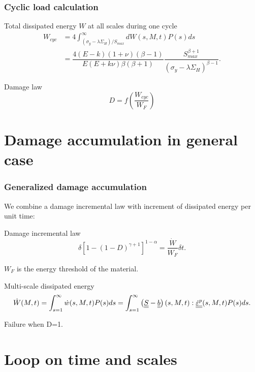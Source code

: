 \documentclass[xcolor=table]{Bredelebeamer}
\begin{document}
	\begin{frame}
		\frametitle{Cyclic load calculation}	
	\begin{block}{Total dissipated energy $W$  at all scales during one cycle}
		\begin{equation}
		\begin{split}
		W_{cyc}&=4\int_{\left( \sigma_y-\lambda \Sigma_H\right) /S_{max}}^{\infty}dW(s,M,t)P(s)ds
		\\&=\dfrac{4(E-k)(1+\nu)\left( \beta-1\right) }{ E(E+k\nu)\beta\left( \beta+1\right) }\dfrac{S_{max}^{\beta+1}}{\left( \sigma_y-\lambda \Sigma_H\right) ^{\beta-1}}.
		\end{split}
		\end{equation}
	\end{block}
	\begin{block}{Damage law}
		\begin{equation}
D=f\left(\dfrac{W_{cyc}}{W_F} \right) 
		\end{equation}
	\end{block}
\end{frame}	


\section{Damage accumulation in general case}
\begin{frame}
	\frametitle{Generalized damage accumulation}	
	We combine a damage incremental law with increment of dissipated energy per unit time:
	\begin{block}{Damage incremental law}	
\begin{equation}
	\delta [1-(1-D)^{\gamma+1}]^{1-\alpha}=\dfrac{\dot{W}}{W_F}\delta t.
	\label{dt}
\end{equation}
	\end{block}
	$W_F$ is the energy threshold of the material.	
		\begin{block}{Multi-scale dissipated energy}	
\begin{equation}\dot{W}(M,t)=\int_{s=1}^{\infty}\dot{w}(s,M,t)P(s)ds=\int_{s=1}^{\infty}\left(\uline{\uline{S}}-\uline{\uline{b}} \right) (s,M,t):\uline{\uline{\dot{\varepsilon}^p}}(s,M,t)P(s)ds.
\end{equation}
		\end{block}
		Failure when D=1.
\end{frame}	

\section{Loop on time and scales}
\end{document}
